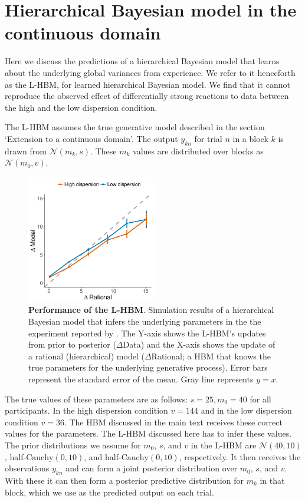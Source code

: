 \newpage 


\section{Hierarchical Bayesian model in the continuous domain}
\label{app:LTI_HBM}

Here we discuss the predictions of a hierarchical Bayesian model that learns about the underlying global variances from experience. We refer to it henceforth as the L-HBM, for learned hierarchical Bayesian model. We find that it cannot reproduce the observed effect of differentially strong reactions to data between the high and the low dispersion condition. 

The L-HBM assumes the true generative model described in the section `Extension to a continuous domain'. The output $y_{kn}$ for trial $n$ in a block $k$ is drawn from $\mathcal{N}(m_k,s)$. These $m_k$ values are distributed over blocks as $\mathcal{N}(m_0,v)$.


\begin{figure}[hb!]
\centering
    \includegraphics[width=0.5\textwidth]{figures/samstan.pdf}
  \caption{\textbf{Performance of the L-HBM}. Simulation results of a hierarchical Bayesian model that infers the underlying parameters in the the experiment reported by \cite{gershman2017blessing}. The Y-axis shows the L-HBM's updates from prior to posterior ($\Delta$Data) and the X-axis shows the update of a rational (hierarchical) model ($\Delta$Rational; a HBM that knows the true parameters for the underlying generative process). Error bars represent the standard error of the mean. Gray line represents $y=x$.} 
  \label{fig:App:hierBayes}
\end{figure}

The true values of these parameters are as follows: $s = 25, m_0 = 40$ for all participants. In the high dispersion condition $v = 144$ and in the low dispersion condition $v = 36$.  The HBM discussed in the main text receives these correct values for the parameters. The L-HBM discussed here has to infer these values. The prior distributions we assume for $m_0$, $s$, and $v$ in the L-HBM are $\mathcal{N}(40,10)$, half-$\mathrm{Cauchy}(0,10)$, and half-$\mathrm{Cauchy}(0,10)$, respectively. It then receives the observations $y_{kn}$ and can form a joint posterior distribution over $m_0$, $s$, and $v$. With these it can then form a posterior predictive distribution for $m_k$ in that block, which we use as the predicted output on each trial.

